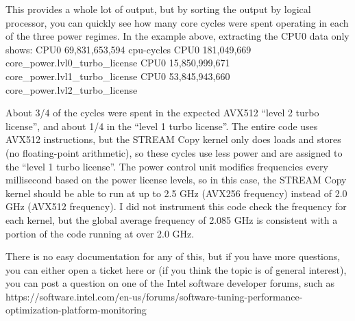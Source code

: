 This provides a whole lot of output, but by sorting the output by
logical processor, you can quickly see how many core cycles were spent
operating in each of the three power regimes. In the example above,
extracting the CPU0 data only shows:
CPU0 69,831,653,594 cpu-cycles
CPU0 181,049,669 core_power.lvl0_turbo_license
CPU0 15,850,999,671 core_power.lvl1_turbo_license
CPU0 53,845,943,660 core_power.lvl2_turbo_license

About 3/4 of the cycles were spent in the expected AVX512 ``level 2
turbo license'', and about 1/4 in the ``level 1 turbo license''.
The entire code uses AVX512 instructions, but the STREAM Copy kernel
only does loads and stores (no floating-point arithmetic), so these
cycles use less power and are assigned to the ``level 1 turbo
license''. The power control unit modifies frequencies every
millisecond based on the power license levels, so in this case, the
STREAM Copy kernel should be able to run at up to 2.5 GHz (AVX256
frequency) instead of 2.0 GHz (AVX512 frequency). I did not instrument
this code check the frequency for each kernel, but the global average
frequency of 2.085 GHz is consistent with a portion of the code
running at over 2.0 GHz.

There is no easy documentation for any of this, but if you have more
questions, you can either open a ticket here or (if you think the
topic is of general interest), you can post a question on one of the
Intel software developer forums, such as
https://software.intel.com/en-us/forums/software-tuning-performance-optimization-platform-monitoring

